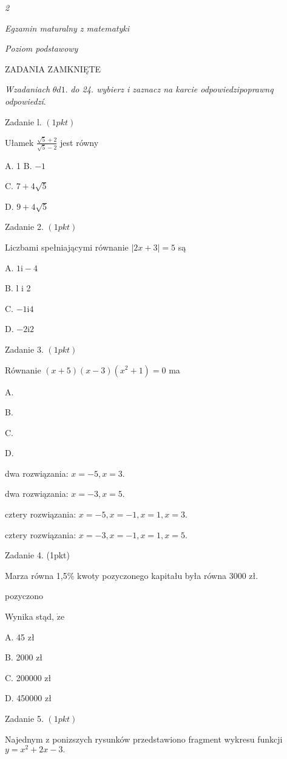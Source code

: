\documentclass[a4paper,12pt]{article}
\begin{document}
{\it 2}

{\it Egzamin maturalny z matematyki}

{\it Poziom podstawowy}

ZADANIA ZAMKNIĘTE

{\it Wzadaniach} $\theta d1.$ {\it do 24. wybierz i zaznacz na karcie odpowiedzipoprawnq odpowiedzí}.

Zadanie l. $(1pkt)$

Ułamek $\displaystyle \frac{\sqrt{5}+2}{\sqrt{5}-2}$ jest równy

A. 1 B. $-1$

C. $7+4\sqrt{5}$

D. $9+4\sqrt{5}$

Zadanie 2. $(1pkt)$

Liczbami spełniającymi równanie $|2x+3|=5$ są

A. $1\mathrm{i}-4$

B. l i 2

C. $-1\mathrm{i}4$

D. $-2\mathrm{i}2$

Zadanie 3. $(1pkt)$

Równanie $(x+5)(x-3)(x^{2}+1)=0$ ma

A.

B.

C.

D.

dwa rozwiązania: $x=-5, x=3.$

dwa rozwiązania: $x=-3, x=5.$

cztery rozwiązania: $x=-5, x=-1, x=1, x=3.$

cztery rozwiązania: $x=-3, x=-1, x=1, x=5.$

Zadanie 4. (1pkt)

Marza równa 1,5\% kwoty pozyczonego kapitału była równa 3000 zł.

pozyczono

Wynika stąd, $\dot{\mathrm{z}}\mathrm{e}$

A. 45 zł

B. 2000 zł

C. 200000 zł

D. 450000 zł

Zadanie 5. $(1pkt)$

Najednym z ponizszych rysunków przedstawiono fragment wykresu funkcji $y=x^{2}+2x-3.$
\end{document}
